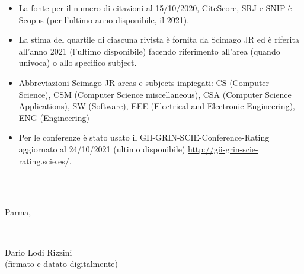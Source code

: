 \documentclass[11pt]{article}
\begin{document}
\begin{itemize}
\item La fonte per il numero di citazioni al 15/10/2020, CiteScore, SRJ e SNIP \`e Scopus (per l'ultimo anno disponibile, il 2021). 
\item La stima del quartile di ciascuna rivista \`e fornita da Scimago JR ed \`e riferita all'anno 2021 (l'ultimo disponibile) facendo riferimento all'area (quando univoca) o allo specifico subject.
\item Abbreviazioni Scimago JR areas e subjects impiegati: 
   CS (Computer Science), 
   CSM (Computer Science miscellaneous), 
   CSA (Computer Science Applications), 
   SW (Software), 
   EEE (Electrical and Electronic Engineering), 
   ENG (Engineering)
\item Per le conferenze \`e stato usato il GII-GRIN-SCIE-Conference-Rating aggiornato al 24/10/2021 (ultimo disponibile) \url{http://gii-grin-scie-rating.scie.es/}. 
\end{itemize}

~\\
~\\
\vfill
\begin{minipage}[t]{7.0cm}
  \raggedright
  \parbox{7.0cm}{\centering
    Parma, %
  }\\
\end{minipage}%
\hfill
\begin{minipage}[t]{7.0cm}
  \parbox{7.0cm}{\centering
    Dario Lodi Rizzini \\
    {\footnotesize (firmato e datato digitalmente) }
  }
\end{minipage}


%
%
%
\end{document}
